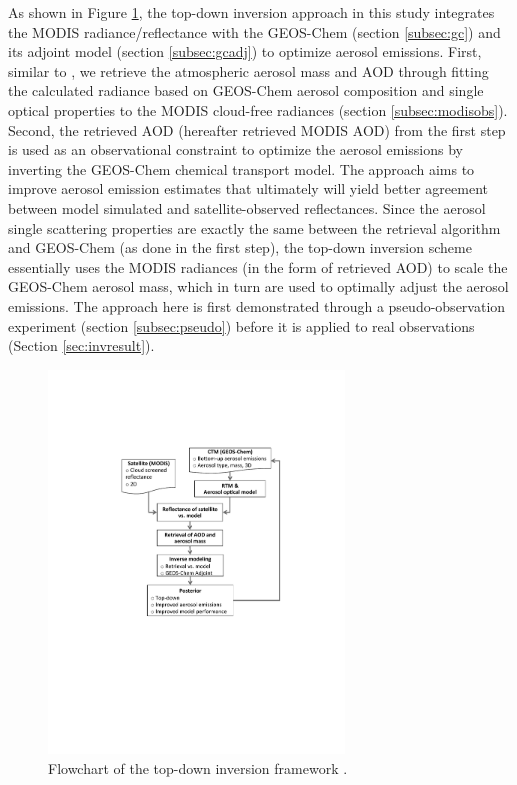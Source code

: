  As shown in Figure \ref{fig:flowchat}, the top-down inversion approach in 
this study integrates the MODIS radiance/reflectance with the GEOS-Chem 
(section \ref{subsec:gc}) and its adjoint model (section \ref{subsec:gcadj}) 
to optimize aerosol emissions. First, similar to \citet{Wang10}, we retrieve
the atmospheric aerosol mass and AOD through fitting the calculated radiance
based on GEOS-Chem aerosol composition and single optical properties to the 
MODIS cloud-free radiances (section \ref{subsec:modisobs}). Second, the 
retrieved AOD (hereafter retrieved MODIS AOD) from the first step is used as 
an observational constraint to optimize the aerosol emissions by inverting the
GEOS-Chem chemical transport model. The approach aims to improve aerosol 
emission estimates that ultimately will yield better agreement between model
simulated and satellite-observed reflectances.  Since the aerosol single 
scattering properties are exactly the same between the retrieval algorithm and
GEOS-Chem (as done in the first step), the top-down inversion scheme 
essentially uses the MODIS radiances (in the form of retrieved AOD) to scale 
the GEOS-Chem aerosol mass, which in turn are used to optimally adjust  the 
aerosol emissions. The approach here is first demonstrated through a 
pseudo-observation experiment (section \ref{subsec:pseudo}) before it is 
applied to real observations (Section \ref{sec:invresult}).

 \begin{figure}[t]
  \centering
  \includegraphics[width={0.7\textwidth}]{figures/a1.pdf}
  \caption[Flowchart of the top-down inversion framework.]
  {Flowchart of the top-down inversion framework \citep{Xu13}.}
  \label{fig:flowchat}
 \end{figure}

